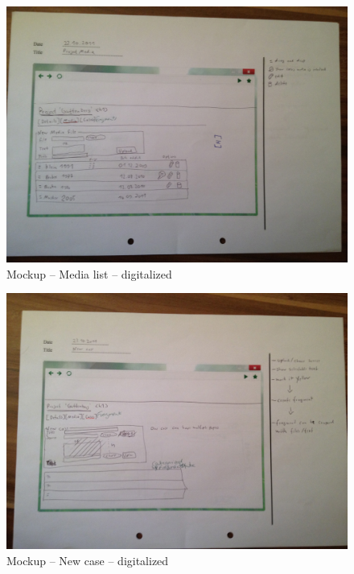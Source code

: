 \begin{appendix}
\begin{figure}[tbp]
  \centering
    \includegraphics[width=\textwidth]{mockups/m_media_list.jpg}
  \caption{Mockup – Media list – digitalized }
  \label{fig:mMediaListMockup}
\end{figure}

\begin{figure}[tbp]
  \centering
    \includegraphics[width=\textwidth]{mockups/m_new_case.jpg}
  \caption{Mockup – New case – digitalized }
  \label{fig:1newCaseMockup}
\end{figure}


\end{appendix}
